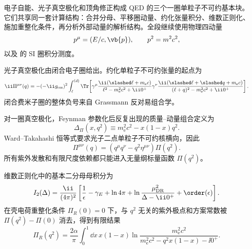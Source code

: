 
电子自能、光子真空极化和顶角修正构成 QED 的三个一圈单粒子不可约基本块。它们共享同一套计算结构：合并分母、平移圈动量、约化张量积分、维数正则化、施加重整化条件，再分析外部动量的解析结构。全段继续使用物理四动量
\begin{equation*}
 p^\mu=(E/c,\vb{p}),
 \qquad p^2=m^2c^2,
\end{equation*}
以及 的 SI 圈积分测度。

光子真空极化由闭合电子圈给出。约化单粒子不可约张量的起点为
\begin{equation}
 {
 \ii\Pi^{\mu\nu}(q)
 =-(-\ii g_{\rm em})^2
 \int_{\ell}^{(d)}
 \Tr\!\left[
 \gamma^\mu\frac{\ii(\slashed\ell+m_{\mathrm e} c)}{\ell^2-m_{\mathrm e}^2c^2+\ii0^+}
 \gamma^\nu\frac{\ii(\slashed\ell+\slashed q+m_{\mathrm e} c)}{(\ell+q)^2-m_{\mathrm e}^2c^2+\ii0^+}
 \right].}
 \label{eq:vacuum-polarization-loop}
\end{equation}
闭合费米子圈的整体负号来自 Grassmann 反对易组合学。

对一圈真空极化，Feynman 参数化后反复出现的质量--动量组合定义为
\begin{equation}
 {
 \Delta_\Pi(x,q^2)
 \equiv m_{\mathrm e}^2c^2-x(1-x)q^2.}
 \label{eq:Pi-Delta-r12}
\end{equation}
Ward--Takahashi 恒等式要求光子二点单粒子不可约核横向，因此
\begin{equation}
 {
 \Pi^{\mu\nu}(q)
 =(q^\mu q^\nu-q^2\eta^{\mu\nu})\Pi(q^2).}
 \label{eq:Pi-transverse-r12}
\end{equation}
所有紫外发散和有限尺度依赖都只能进入无量纲标量函数 \(\Pi(q^2)\)。

维数正则化中的基本二分母母积分为
\begin{equation}
 I_2(\Delta)
 =\frac{\ii}{(4\pi)^2}
 \left[
 \frac1\epsilon-\gamma_E+\ln4\pi
 +\ln\frac{\mu_{\rm DR}^2}{\Delta-\ii0^+}
 +\order(\epsilon)
 \right].
 \label{eq:I2-expanded-r12}
\end{equation}
在壳电荷重整化条件 \(\Pi_R(0)=0\) 下，与 \(q^2\) 无关的紫外极点和方案常数被 \(\Pi(q^2)-\Pi(0)\) 消去，得到有限结果
\begin{equation}
 {
 \Pi_R(q^2)
 =\frac{2\alpha}{\pi}
 \int_0^1\dd x\,x(1-x)
 \ln\frac{m_{\mathrm e}^2c^2}
 {m_{\mathrm e}^2c^2-q^2x(1-x)-\ii0^+}.}
 \label{eq:Pi-renormalized-r12}
\end{equation}


